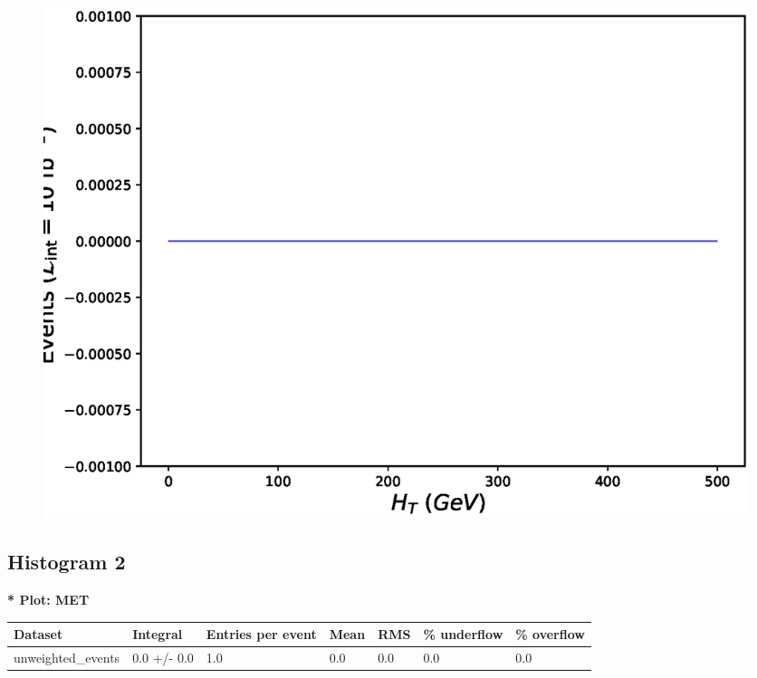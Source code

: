\documentclass[a4paper, 10pt]{article}
\begin{document}
\begin{figure}[H]
  \begin{center}
    \includegraphics[scale=0.45]{selection_0.eps}\\
\caption{   }
  \end{center}
\end{figure}
      \newpage
\subsection{ Histogram 2}

\textbf{* Plot: MET}\\
   \begin{table}[H]
  \begin{center}
    \begin{tabular}{|m{23.0mm}|m{23.0mm}|m{18.0mm}|m{19.0mm}|m{19.0mm}|m{19.0mm}|m{19.0mm}|}
      \hline
      {\cellcolor{yellow}         Dataset}& {\cellcolor{yellow}         Integral}& {\cellcolor{yellow}         Entries per event}& {\cellcolor{yellow}         Mean}& {\cellcolor{yellow}         RMS}& {\cellcolor{yellow}         \% underflow}& {\cellcolor{yellow}         \% overflow}\\
      \hline
      {\cellcolor{white}         unweighted\_events}& {\cellcolor{white}         0.0 +/\-- 0.0}& {\cellcolor{white}         1.0}& {\cellcolor{white}         0.0}& {\cellcolor{white}         0.0}& {\cellcolor{green}         0.0}& {\cellcolor{green}         0.0}\\
\hline
    \end{tabular}
  \end{center}
\end{table}
\end{document}

